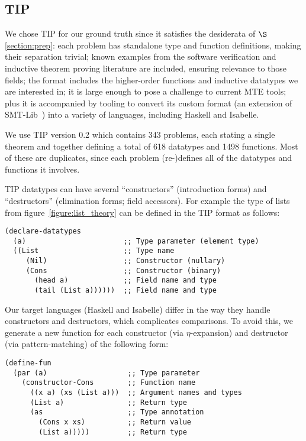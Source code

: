 \subsection{TIP} %

We chose TIP for our ground truth since it satisfies the desiderata of
$\S$\ref{section:prep}: each problem has standalone type and function
definitions, making their separation trivial; known examples from the software
verification and inductive theorem proving literature are included, ensuring
relevance to those fields; the format includes the higher-order functions and
inductive datatypes we are interested in; it is large enough to pose a challenge
to current MTE tools; plus it is accompanied by tooling to convert its custom
format (an extension of SMT-Lib~\cite{BarFT-SMTLIB}) into a variety of
languages, including Haskell and Isabelle.

We use TIP version 0.2 which contains 343 problems, each stating a single
theorem and together defining a total of 618 datatypes and 1498 functions. Most
of these are duplicates, since each problem (re\nobreakdash-)defines all of the
datatypes and functions it involves.

TIP datatypes can have several ``constructors'' (introduction forms) and
``destructors'' (elimination forms; field accessors). For example the type of
lists from figure~\ref{figure:list_theory} can be defined in the TIP format as
follows:

\begin{samepage}
\begin{verbatim}
(declare-datatypes
  (a)                       ;; Type parameter (element type)
  ((List                    ;; Type name
     (Nil)                  ;; Constructor (nullary)
     (Cons                  ;; Constructor (binary)
       (head a)             ;; Field name and type
       (tail (List a))))))  ;; Field name and type
\end{verbatim}
\end{samepage}

Our target languages (Haskell and Isabelle) differ in the way they handle
constructors and destructors, which complicates comparisons. To avoid this, we
generate a new function for each constructor (via $\eta$-expansion) and
destructor (via pattern-matching) of the following form:

\begin{samepage}
\begin{verbatim}
(define-fun
  (par (a)                   ;; Type parameter
    (constructor-Cons        ;; Function name
      ((x a) (xs (List a)))  ;; Argument names and types
      (List a)               ;; Return type
      (as                    ;; Type annotation
        (Cons x xs)          ;; Return value
        (List a)))))         ;; Return type
\end{verbatim}
\end{samepage}

